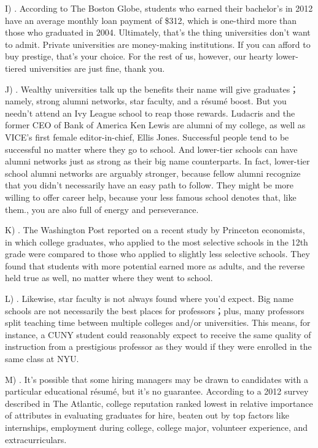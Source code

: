 \documentclass[UTF8,11pt]{ctexart}
\begin{document}
I) . According to The Boston Globe, students who earned their bachelor’s in 2012 have an average monthly loan payment of \$312, which is one-third more than those who graduated in 2004. Ultimately, that’s the thing universities don’t want to admit. Private universities are money-making institutions. If you can afford to buy prestige, that’s your choice. For the rest of us, however, our hearty lower-tiered universities are just fine, thank you.


J) . Wealthy universities talk up the benefits their name will give graduates；namely, strong alumni networks, star faculty, and a résumé boost. But you needn’t attend an Ivy League school to reap those rewards. Ludacris and the former CEO of Bank of America Ken Lewis are alumni of my college, as well as VICE’s first female editor-in-chief, Ellis Jones. Successful people tend to be successful no matter where they go to school. And lower-tier schools can have alumni networks just as strong as their big name counterparts. In fact, lower-tier school alumni networks are arguably stronger, because fellow alumni recognize that you didn’t necessarily have an easy path to follow. They might be more willing to offer career help, because your less famous school denotes that, like them., you are also full of energy and perseverance.


K) . The Washington Post reported on a recent study by Princeton economists, in which college graduates, who applied to the most selective schools in the 12th grade were compared to those who applied to slightly less selective schools. They found that students with more potential earned more as adults, and the reverse held true as well, no matter where they went to school.


L) . Likewise, star faculty is not always found where you’d expect. Big name schools are not necessarily the best places for professors；plus, many professors split teaching time between multiple colleges and/or universities. This means, for instance, a CUNY student could reasonably expect to receive the same quality of instruction from a prestigious professor as they would if they were enrolled in the same class at NYU.


M) . It’s possible that some hiring managers may be drawn to candidates with a particular educational résumé, but it’s no guarantee. According to a 2012 survey described in The Atlantic, college reputation ranked lowest in relative importance of attributes in evaluating graduates for hire, beaten out by top factors like internships, employment during college, college major, volunteer experience, and extracurriculars.
\end{document}
